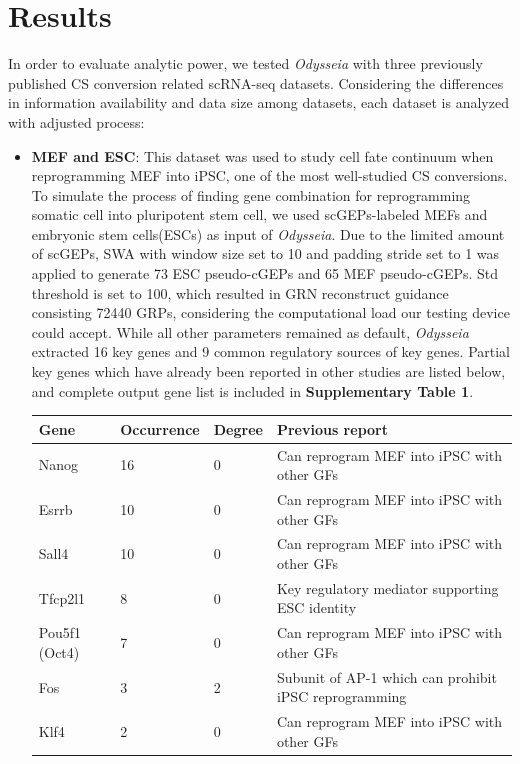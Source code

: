 \documentclass[fleqn,10pt]{wlscirep}
\begin{document}
\section*{Results}
\label{res}
In order to evaluate analytic power, we tested \emph{Odysseia} with three previously published CS conversion related scRNA-seq datasets.
Considering the differences in information availability and data size among datasets, each dataset is analyzed with adjusted process:
\begin{itemize}
\setlength\itemsep{0em}
\item \textbf{MEF and ESC}:
This dataset was used to study cell fate continuum when reprogramming MEF into iPSC, one of the most well-studied CS conversions.\cite{mef_ipsc_cas}
To simulate the process of finding gene combination for reprogramming somatic cell into pluripotent stem cell, we used scGEPs-labeled MEFs and embryonic stem cells(ESCs) as input of \emph{Odysseia}.
Due to the limited amount of scGEPs, SWA with window size set to 10 and padding stride set to 1 was applied to generate 73 ESC pseudo-cGEPs and 65 MEF pseudo-cGEPs.
Std threshold is set to 100, which resulted in GRN reconstruct guidance consisting 72440 GRPs, considering the computational load our testing device could accept.
While all other parameters remained as default, \emph{Odysseia} extracted 16 key genes and 9 common regulatory sources of key genes.
Partial key genes which have already been reported in other studies are listed below, and complete output gene list is included in \textbf{Supplementary Table 1}.

\begin{table}[ht]
\centering
\begin{tabular}{|l|l|l|l|}
\hline
\textbf{Gene} & \textbf{Occurrence} & \textbf{Degree} & \textbf{Previous report}  \\
\hline
Nanog & 16 & 0 & Can reprogram MEF into iPSC with other GFs\cite{ips7f, oct4_nanog_sox2_lin28, oct4_nanog_sox2} \\
\hline
Esrrb & 10 & 0 & Can reprogram MEF into iPSC with other GFs\cite{ips7f, LIF_esrrb, gtmEsrrb_iPSC, JARID2_PRDM14_ESRRB_SALL4A} \\
\hline
Sall4 & 10 & 0 & Can reprogram MEF into iPSC with other GFs\cite{ips7f, JARID2_PRDM14_ESRRB_SALL4A} \\
\hline
Tfcp2l1 & 8 & 0 & Key regulatory mediator supporting ESC identity\cite{tfcp2l1_1, tfcp2l1_2} \\
\hline
Pou5f1 (Oct4) & 7 & 0 & Can reprogram MEF into iPSC with other GFs\cite{yamanaka_2006, oct4_nanog_sox2_lin28, oct4_nanog_sox2, ips2f, ipsOK, osk} \\
\hline
Fos & 3 & 2 & Subunit of AP-1 which can prohibit iPSC reprogramming\cite{ips7f, ipsAP1} \\
\hline
Klf4 & 2 & 0 & Can reprogram MEF into iPSC with other GFs\cite{yamanaka_2006, ips2f, ipsOK, osk} \\
\hline
\end{tabular}
\end{table}


\end{itemize}
\end{document}
